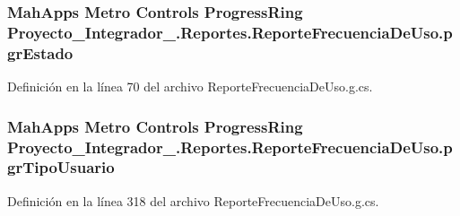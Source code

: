\hypertarget{class_proyecto___integrador__3_1_1_reportes_1_1_reporte_frecuencia_de_uso_a40046fa9e14c98adb20dbc8f99f83842}{
\subsubsection[{pgr\-Estado}]{\setlength{\rightskip}{0pt plus 5cm}Mah\-Apps Metro Controls Progress\-Ring Proyecto\-\_\-\-Integrador\-\_.\-Reportes.\-Reporte\-Frecuencia\-De\-Uso.\-pgr\-Estado\hspace{0.3cm}{\ttfamily [package]}}}\label{class_proyecto___integrador__3_1_1_reportes_1_1_reporte_frecuencia_de_uso_a40046fa9e14c98adb20dbc8f99f83842}


Definición en la línea 70 del archivo Reporte\-Frecuencia\-De\-Uso.\-g.\-cs.

\hypertarget{class_proyecto___integrador__3_1_1_reportes_1_1_reporte_frecuencia_de_uso_a6e3380fcd1c9e0e520f2867c8a98d9f0}{
\subsubsection[{pgr\-Tipo\-Usuario}]{\setlength{\rightskip}{0pt plus 5cm}Mah\-Apps Metro Controls Progress\-Ring Proyecto\-\_\-\-Integrador\-\_.\-Reportes.\-Reporte\-Frecuencia\-De\-Uso.\-pgr\-Tipo\-Usuario\hspace{0.3cm}{\ttfamily [package]}}}\label{class_proyecto___integrador__3_1_1_reportes_1_1_reporte_frecuencia_de_uso_a6e3380fcd1c9e0e520f2867c8a98d9f0}


Definición en la línea 318 del archivo Reporte\-Frecuencia\-De\-Uso.\-g.\-cs.

